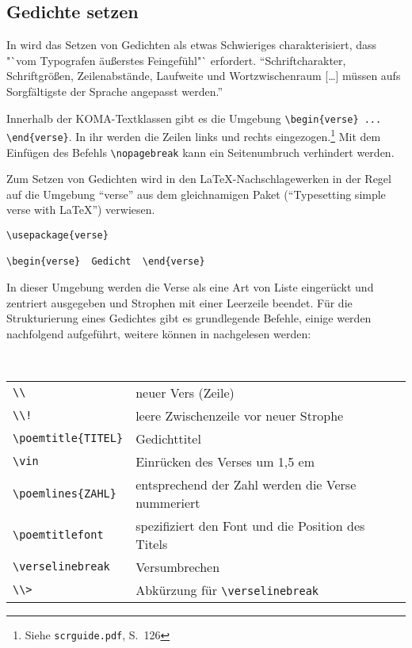 \subsection{Gedichte setzen}

In \cite[S.\,94]{Willberg} wird das Setzen von Gedichten als etwas Schwieriges
charakterisiert, dass "`vom Typografen äußerstes Feingefühl"` erfordert. "`Schriftcharakter, Schriftgrößen, Zeilenabstände, Laufweite und Wortzwischenraum [\ldots] müssen aufs Sorgfältigste der Sprache angepasst werden."'

Innerhalb der KOMA-Textklassen gibt es die Umgebung \verb|\begin{verse} ... \end{verse}|.
In ihr werden die Zeilen links und rechts eingezogen.\footnote{Siehe \texttt{scrguide.pdf},
S.~126}
Mit dem Einfügen des Befehls \verb|\nopagebreak| kann ein Seitenumbruch verhindert werden. 

Zum Setzen von Gedichten wird in den \LaTeX -Nachschlagewerken in der Regel
auf die Umgebung "`verse"' aus dem gleichnamigen  Paket ("`Typesetting simple 
verse with \LaTeX "') verwiesen. 

\begin{lstlisting}
\usepackage{verse}

\begin{verse}  Gedicht  \end{verse}
\end{lstlisting}

In dieser Umgebung werden die Verse als eine Art von Liste eingerückt und zentriert
ausgegeben und Strophen mit einer Leerzeile beendet. Für die
Strukturierung eines Gedichtes gibt es grundlegende Befehle, einige werden
nachfolgend aufgeführt, weitere können in \cite[S.\,5\,f.]{Wilson} nachgelesen
werden:

~\\
\begin{tabular}{ll}
\verb|\\| & neuer Vers (Zeile) \\
\verb|\\!|& leere Zwischenzeile vor neuer Strophe \\
\verb|\poemtitle{TITEL}| & Gedichttitel \\
\verb|\vin| & Einrücken des Verses um 1,5 em \\
\verb|\poemlines{ZAHL}| & entsprechend der Zahl werden die Verse nummeriert\\
\verb|\poemtitlefont| & spezifiziert den Font und die Position des Titels\\
\verb|\verselinebreak| & Versumbrechen \\
\verb|\\>| & Abkürzung für \verb|\verselinebreak|\\
\end{tabular}

